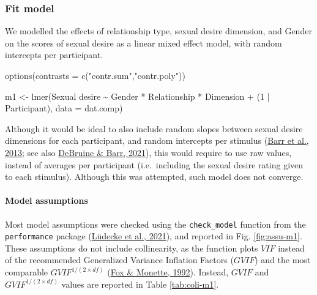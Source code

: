 \documentclass[
  bookmarksnumbered]{article}
\newenvironment{Shaded}{\begin{snugshade}}{\end{snugshade}}
\newcommand{\AttributeTok}[1]{\textcolor[rgb]{0.80,0.80,0.80}{#1}}
\newcommand{\DecValTok}[1]{\textcolor[rgb]{0.86,0.86,0.80}{#1}}
\newcommand{\FunctionTok}[1]{\textcolor[rgb]{0.94,0.94,0.56}{#1}}
\newcommand{\NormalTok}[1]{\textcolor[rgb]{0.80,0.80,0.80}{#1}}
\newcommand{\OtherTok}[1]{\textcolor[rgb]{0.94,0.94,0.56}{#1}}
\newcommand{\SpecialCharTok}[1]{\textcolor[rgb]{0.86,0.64,0.64}{#1}}
\newcommand{\StringTok}[1]{\textcolor[rgb]{0.80,0.58,0.58}{#1}}
\begin{document}
\hypertarget{fit-model}{%
\subsubsection{Fit model}\label{fit-model}}

We modelled the effects of relationship type, sexual desire dimension, and Gender on the scores of sexual desire as a linear mixed effect model, with random intercepts per participant.

\begin{Shaded}
\begin{Highlighting}[]
\FunctionTok{options}\NormalTok{(}\AttributeTok{contrasts =} \FunctionTok{c}\NormalTok{(}\StringTok{"contr.sum"}\NormalTok{,}\StringTok{"contr.poly"}\NormalTok{))}

\NormalTok{m1 }\OtherTok{\textless{}{-}} \FunctionTok{lmer}\NormalTok{(}\StringTok{\textasciigrave{}}\AttributeTok{Sexual desire}\StringTok{\textasciigrave{}} \SpecialCharTok{\textasciitilde{}}\NormalTok{ Gender }\SpecialCharTok{*}\NormalTok{ Relationship }\SpecialCharTok{*}\NormalTok{ Dimension }\SpecialCharTok{+} 
\NormalTok{            (}\DecValTok{1} \SpecialCharTok{|}\NormalTok{ Participant), }
            \AttributeTok{data =}\NormalTok{ dat.comp)}
\end{Highlighting}
\end{Shaded}

Although it would be ideal to also include random slopes between sexual desire dimensions for each participant, and random intercepts per stimulus (\protect\hyperlink{ref-barr2013}{Barr et al., 2013}; see also \protect\hyperlink{ref-debruine2021}{DeBruine \& Barr, 2021}), this would require to use raw values, instead of averages per participant (i.e.~including the sexual desire rating given to each stimulus). Although this was attempted, such model does not converge.

\hypertarget{model-assumptions}{%
\paragraph{Model assumptions}\label{model-assumptions}}

Most model assumptions were checked using the \texttt{check\_model} function from the \texttt{performance} package (\protect\hyperlink{ref-ludecke2021}{Lüdecke et al., 2021}), and reported in Fig. \ref{fig:assu-m1}. These assumptions do not include collinearity, as the function plots \(VIF\) instead of the recommended Generalized Variance Inflation Factors (\(GVIF\)) and the most comparable \(GVIF^{{1}/{(2 \times df)}}\) (\protect\hyperlink{ref-fox1992}{Fox \& Monette, 1992}). Instead, \(GVIF\) and \(GVIF^{{1}/{(2 \times df)}}\) values are reported in Table \ref{tab:coli-m1}.
\end{document}
